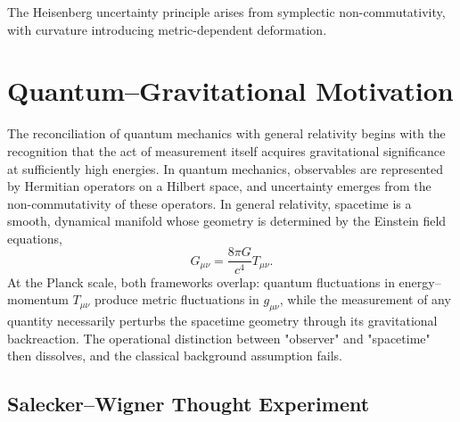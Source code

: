 \documentclass[11pt,oneside]{book}
\newenvironment{booknote}{
  \begin{tcolorbox}[
    colback=gray!3!white,
    colframe=gray!45!black,
    fonttitle=\bfseries,
    title=\textbf{Book Note},
  ]
}{\end{tcolorbox}}
\numberwithin{equation}{chapter}
\begin{document}
\begin{booknote}
The Heisenberg uncertainty principle arises from symplectic non-commutativity, with curvature introducing metric-dependent deformation.
\end{booknote}
\clearpage
\section{Quantum–Gravitational Motivation}

The reconciliation of quantum mechanics with general relativity begins with the recognition that the act of measurement itself acquires gravitational significance at sufficiently high energies.  
In quantum mechanics, observables are represented by Hermitian operators on a Hilbert space, and uncertainty emerges from the non-commutativity of these operators.  
In general relativity, spacetime is a smooth, dynamical manifold whose geometry is determined by the Einstein field equations,
\begin{equation}
G_{\mu\nu} = \frac{8\pi G}{c^4}T_{\mu\nu}.
\label{eq:Einstein}
\end{equation}
At the Planck scale, both frameworks overlap: quantum fluctuations in energy--momentum $T_{\mu\nu}$ produce metric fluctuations in $g_{\mu\nu}$, while the measurement of any quantity necessarily perturbs the spacetime geometry through its gravitational backreaction.  
The operational distinction between "observer" and "spacetime" then dissolves, and the classical background assumption fails.

\subsection*{Salecker--Wigner Thought Experiment}
\end{document}

